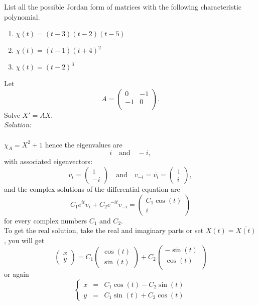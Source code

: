 \begin{Pb}
List all the possible Jordan form of matrices with the following characteristic polynomial. 
\begin{enumerate}
\item $\chi(t) = (t-3)(t-2)(t-5) $
\item $\chi(t) = (t-1)(t+4)^2 $
\item $\chi(t) = (t-2)^3 $
\end{enumerate}
\end{Pb}

\begin{Pb}
Let 
\[A= \begin{pmatrix}
 0 & -1  \\
-1 & 0 \\
\end{pmatrix}.\]
Solve $X'=AX$.\\

\textit{Solution:}\\
\\
$\chi_A = X^2 +1 $ hence the eigenvalues are 
\[i \quad \text{and} \quad -i,\]
with associated eigenvectors:
\[v_{i} = \begin{pmatrix} 1 \\ -i \end{pmatrix} \quad \text{and} \quad v_{-i} = \overline{v_{i}} = \begin{pmatrix} 1 \\ i \end{pmatrix} ,\]
and the complex solutions of the differential equation are
\[C_1 e^{it} v_{i} + C_2 e^{-it} v_{-i} = \begin{pmatrix} C_1 \cos (t)  \\ i \end{pmatrix} \]
for every complex numbers $C_1$ and $C_2$.\\

To get the real solution, take the real and imaginary parts or set $X(t) = \overline{X(t)}$, you will get
\[\begin{pmatrix}  x  \\ y \end{pmatrix} = C_1 \begin{pmatrix}  \cos (t)  \\ \sin (t) \end{pmatrix} + C_2 \begin{pmatrix}  -\sin (t) \\ \cos (t)   \\  \end{pmatrix} \]
or again
\[\left\{\begin{array}{rcl}  x & = & C_1  \cos (t) - C_2 \sin (t) \\ 
                             y & = & C_1 \sin (t)  + C_2  \cos (t)  
\end{array} \right.\]
\end{Pb}




































